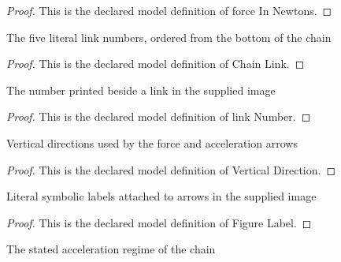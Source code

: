 \begin{proof}
  This is the declared model definition of force In Newtons.
\end{proof}
\begin{definition}
  \label{def:physics:phyx-mini-0761:phyxminiproblems-problemphyxmini0761-chainlink}
  The five literal link numbers, ordered from the bottom of the chain
\end{definition}
\begin{proof}
  This is the declared model definition of Chain Link.
\end{proof}
\begin{definition}
  \label{def:physics:phyx-mini-0761:phyxminiproblems-problemphyxmini0761-linknumber}
  The number printed beside a link in the supplied image
\end{definition}
\begin{proof}
  This is the declared model definition of link Number.
\end{proof}
\begin{definition}
  \label{def:physics:phyx-mini-0761:phyxminiproblems-problemphyxmini0761-verticaldirection}
  Vertical directions used by the force and acceleration arrows
\end{definition}
\begin{proof}
  This is the declared model definition of Vertical Direction.
\end{proof}
\begin{definition}
  \label{def:physics:phyx-mini-0761:phyxminiproblems-problemphyxmini0761-figurelabel}
  Literal symbolic labels attached to arrows in the supplied image
\end{definition}
\begin{proof}
  This is the declared model definition of Figure Label.
\end{proof}
\begin{definition}
  \label{def:physics:phyx-mini-0761:phyxminiproblems-problemphyxmini0761-chainmotionregime}
  The stated acceleration regime of the chain
\end{definition}
